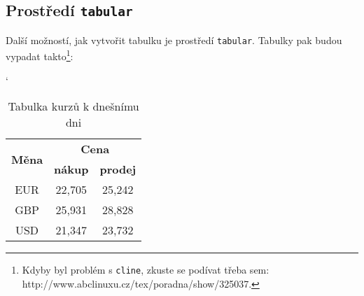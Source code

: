 \documentclass[a4paper,11pt, hidelinks]{article}
\begin{document}
\subsection{Prostředí \texttt{tabular}}
Další možností, jak vytvořit tabulku je prostředí \texttt{tabular}. Tabulky pak budou vypadat takto\footnote[1]{Kdyby byl problém s \texttt{cline}, zkuste se podívat třeba sem: http://www.abclinuxu.cz/tex/poradna/show/325037.}:

\begin{table}[h]
\catcode`
\centering
\begin{tabular}{|c|c|c|}
    \hline
    \multirow{2}{*}{\textbf{Měna}} & \multicolumn{2}{|c|}{\textbf{Cena}} \\
    \cline{2-3} %
     & \textbf{nákup} & \textbf{prodej} \\
    \hline
    EUR & 22,705 & 25,242 \\
    GBP & 25,931 & 28,828 \\
    USD & 21,347 & 23,732 \\
    \hline
\end{tabular}
\caption{Tabulka kurzů k dnešnímu dni}
\label{tab:2}
\end{table}
\end{document}

